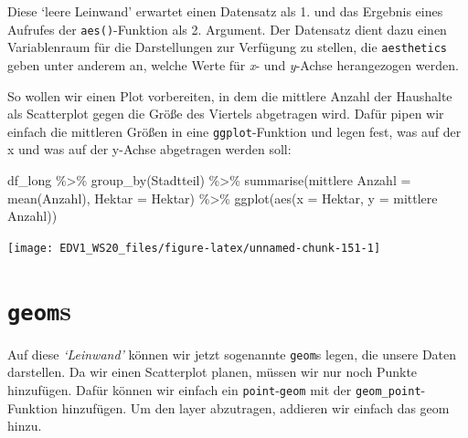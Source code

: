 \documentclass[
]{book}
\newenvironment{Shaded}{\begin{snugshade}}{\end{snugshade}}
\newcommand{\AttributeTok}[1]{\textcolor[rgb]{0.77,0.63,0.00}{#1}}
\newcommand{\FunctionTok}[1]{\textcolor[rgb]{0.00,0.00,0.00}{#1}}
\newcommand{\NormalTok}[1]{#1}
\newcommand{\OtherTok}[1]{\textcolor[rgb]{0.56,0.35,0.01}{#1}}
\newcommand{\SpecialCharTok}[1]{\textcolor[rgb]{0.00,0.00,0.00}{#1}}
\newcommand{\StringTok}[1]{\textcolor[rgb]{0.31,0.60,0.02}{#1}}
\begin{document}
Diese `leere Leinwand' erwartet einen Datensatz als 1. und das Ergebnis eines Aufrufes der \texttt{aes()}-Funktion als 2. Argument.
Der Datensatz dient dazu einen Variablenraum für die Darstellungen zur Verfügung zu stellen, die \texttt{aesthetics} geben unter anderem an, welche Werte für \emph{x}- und \emph{y}-Achse herangezogen werden.

So wollen wir einen Plot vorbereiten, in dem die mittlere Anzahl der Haushalte als Scatterplot gegen die Größe des Viertels abgetragen wird. Dafür pipen wir einfach die mittleren Größen in eine \texttt{ggplot}-Funktion und legen fest, was auf der x und was auf der y-Achse abgetragen werden soll:

\begin{Shaded}
\begin{Highlighting}[]
\NormalTok{df\_long }\SpecialCharTok{\%\textgreater{}\%} 
  \FunctionTok{group\_by}\NormalTok{(Stadtteil) }\SpecialCharTok{\%\textgreater{}\%} 
  \FunctionTok{summarise}\NormalTok{(}\StringTok{\textasciigrave{}}\AttributeTok{mittlere Anzahl}\StringTok{\textasciigrave{}} \OtherTok{=} \FunctionTok{mean}\NormalTok{(Anzahl),}
            \AttributeTok{Hektar =}\NormalTok{ Hektar) }\SpecialCharTok{\%\textgreater{}\%} 
  \FunctionTok{ggplot}\NormalTok{(}\FunctionTok{aes}\NormalTok{(}\AttributeTok{x =}\NormalTok{ Hektar,}
             \AttributeTok{y =} \StringTok{\textasciigrave{}}\AttributeTok{mittlere Anzahl}\StringTok{\textasciigrave{}}\NormalTok{))}
\end{Highlighting}
\end{Shaded}

\begin{center}\texttt{[image: EDV1\_WS20\_files/figure-latex/unnamed-chunk-151-1]} \end{center}

\hypertarget{geoms}{%
\section{\texorpdfstring{\texttt{geom}s}{geoms}}\label{geoms}}

Auf diese \emph{`Leinwand'} können wir jetzt sogenannte \texttt{geom}s legen, die unsere Daten darstellen. Da wir einen Scatterplot planen, müssen wir nur noch Punkte hinzufügen. Dafür können wir einfach ein \texttt{point}-\texttt{geom} mit der \texttt{geom\_point}-Funktion hinzufügen. Um den layer abzutragen, addieren wir einfach das geom hinzu.
\end{document}
